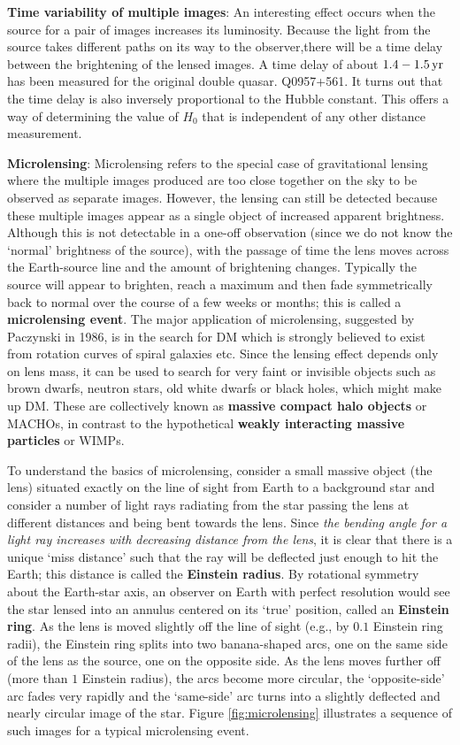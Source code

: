 \documentclass[a4paper,10pt]{article}
\begin{document}
{\noindent}\textbf{Time variability of multiple images}: An interesting effect occurs when the source for a pair of images increases its luminosity. Because the light from the source takes different paths on its way to the observer,there will be a time delay between the brightening of the lensed images. A time delay of about $1.4-1.5\,{\rm yr}$ has been measured for the original double quasar. Q0957+561. It turns out that the time delay is also inversely proportional to the Hubble constant. This offers a way of determining the value of $H_0$ that is independent of any other distance measurement. 

{\noindent}\textbf{Microlensing}: Microlensing refers to the special case of gravitational lensing where the multiple images produced are too close together on the sky to be observed as separate images. However, the lensing can still be detected because these multiple images appear as a single object of increased apparent brightness. Although this is not detectable in a one-off observation (since we do not know the `normal' brightness of the source), with the passage of time the lens moves across the Earth-source line and the amount of brightening changes. Typically the source will appear to brighten, reach a maximum and then fade symmetrically back to normal over the course of a few weeks or months; this is called a \textbf{microlensing event}. The major application of microlensing, suggested by Paczynski in 1986, is in the search for DM which is strongly believed to exist from rotation curves of spiral galaxies etc. Since the lensing effect depends only on lens mass, it can be used to search for very faint or invisible objects such as brown dwarfs, neutron stars, old white dwarfs or black holes, which might make up DM. These are collectively known as \textbf{massive compact halo objects} or MACHOs, in contrast to the hypothetical \textbf{weakly interacting massive particles} or WIMPs.

{\noindent}To understand the basics of microlensing, consider a small massive object (the lens) situated exactly on the line of sight from Earth to a background star and consider a number of light rays radiating from the star passing the lens at different distances and being bent towards the lens. Since \textit{the bending angle for a light ray increases with decreasing distance from the lens}, it is clear that there is a unique `miss distance' such that the ray will be deflected just enough to hit the Earth; this distance is called the \textbf{Einstein radius}. By rotational symmetry about the Earth-star axis, an observer on Earth with perfect resolution would see the star lensed into an annulus centered on its `true' position, called an \textbf{Einstein ring}. As the lens is moved slightly off the line of sight (e.g., by $0.1$ Einstein ring radii), the Einstein ring splits into two banana-shaped arcs, one on the same side of the lens as the source, one on the opposite side. As the lens moves further off (more than $1$ Einstein radius), the arcs become more circular, the `opposite-side' arc fades very rapidly and the `same-side' arc turns into a slightly deflected and nearly circular image of the star. Figure \ref{fig:microlensing} illustrates a sequence of such images for a typical microlensing event.
\end{document}

